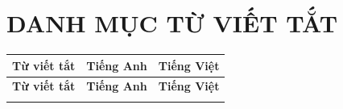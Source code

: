 \chapter*{DANH MỤC TỪ VIẾT TẮT}

\renewcommand{\arraystretch}{1.25}
\begin{longtable}{
    >{\raggedright\arraybackslash}p{}
    >{\raggedright\arraybackslash}p{}
    >{\raggedright\arraybackslash}p{}
}
\toprule
\textbf{Từ viết tắt} & \textbf{Tiếng Anh} & \textbf{Tiếng Việt} \\
\midrule
\endfirsthead
\toprule
\textbf{Từ viết tắt} & \textbf{Tiếng Anh} & \textbf{Tiếng Việt} \\
\midrule
\endhead
\bottomrule
\endfoot


\end{longtable}
